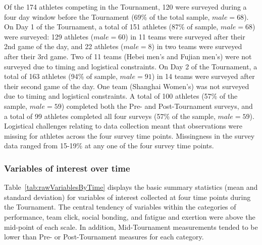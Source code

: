 \begin{CJK}{UTF8}{gbsn}
Of the 174 athletes competing in the Tournament, 120 were surveyed during a four day window before the Tournament (69\% of the total sample, $male = 68$).  On Day 1 of the Tournament, a total of 151 athletes (87\% of sample, $male = 68$) were surveyed: 129 athletes ($male = 60$) in 11 teams were surveyed after their 2nd game of the day, and 22 athletes ($male = 8$) in two teams were surveyed after their 3rd game. Two of 11 teams (Hebei men's and Fujian men's) were not surveyed due to timing and logistical constraints.  On Day 2 of the Tournament, a total of 163 athletes (94\% of sample, $male = 91$) in 14 teams were surveyed after their second game of the day. One team (Shanghai Women's) was not surveyed due to timing and logistical constraints.  A total of 100 athletes (57\% of the sample, $male = 59$) completed both the Pre- and Post-Tournament surveys, and a total of 99 athletes completed all four surveys (57\% of the sample, $male = 59$). Logistical challenges relating to data collection meant that observations were missing for athletes across the four survey time points. Missingness in the survey data ranged from 15-19\% at any one of the four survey time points.\\


\subsubsection{Variables of interest over time}
Table~\ref{tab:rawVariablesByTime} displays the basic summary statistics (mean and standard deviation) for variables of interest collected at four time points during the Tournament.  The central tendency of variables within the categories of performance, team click, social bonding, and fatigue and exertion were above the mid-point of each scale.  In addition, Mid-Tournament measurements tended to be lower than Pre- or Post-Tournament measures for each category.




\end{CJK}
